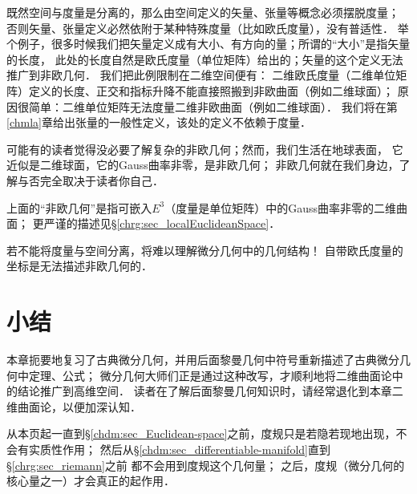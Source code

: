 既然空间与度量是分离的，那么由空间定义的矢量、张量等概念必须摆脱度量；
否则矢量、张量定义必然依附于某种特殊度量（比如欧氏度量），没有普适性．
举个例子，很多时候我们把矢量定义成有大小、有方向的量；所谓的“大小”是指矢量的长度，
此处的长度自然是欧氏度量（单位矩阵）给出的；矢量的这个定义无法推广到非欧几何．
我们把此例限制在二维空间便有：
二维欧氏度量（二维单位矩阵）定义的长度、正交和指标升降不能直接照搬到非欧曲面（例如二维球面）；
原因很简单：{\kaishu 二维单位矩阵无法度量二维非欧曲面（例如二维球面）．}
我们将在第\ref{chmla}章给出张量的一般性定义，该处的定义不依赖于度量．

可能有的读者觉得没必要了解复杂的非欧几何；然而，我们生活在地球表面，
它近似是二维球面，它的Gauss曲率非零，是非欧几何；
非欧几何就在我们身边，了解与否完全取决于读者你自己．

\begin{remark}
	上面的“非欧几何”是指可嵌入$E^3$（度量是单位矩阵）中的Gauss曲率非零的二维曲面；
	更严谨的描述见\S\ref{chrg:sec_localEuclideanSpace}．
\end{remark}


\begin{remark}
	若不能将度量与空间分离，将难以理解微分几何中的几何结构！
	自带欧氏度量的坐标是无法描述非欧几何的．
\end{remark}



\section*{小结}
本章扼要地复习了古典微分几何，并用后面黎曼几何中符号重新描述了古典微分几何中定理、公式；
微分几何大师们正是通过这种改写，才顺利地将二维曲面论中的结论推广到高维空间．
读者在了解后面黎曼几何知识时，请经常退化到本章二维曲面论，以便加深认知．


从本页起一直到\S\ref{chdm:sec_Euclidean-space}之前，度规只是若隐若现地出现，不会有实质性作用；
然后从\S\ref{chdm:sec_differentiable-manifold}直到\S\ref{chrg:sec_riemann}之前
都不会用到度规这个几何量；
之后，度规（微分几何的核心量之一）才会真正的起作用．




\endinput
